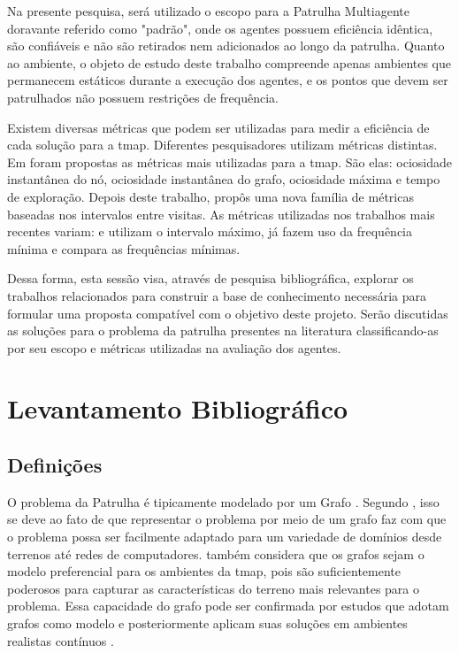 Na presente pesquisa, será utilizado o escopo para a Patrulha Multiagente 
doravante referido como "padrão", onde os agentes possuem eficiência idêntica, 
são confiáveis e não são retirados nem adicionados ao longo da patrulha. Quanto 
ao ambiente, o objeto de estudo deste trabalho compreende apenas ambientes que 
permanecem estáticos durante a execução dos agentes, e os pontos que devem ser 
patrulhados não possuem restrições de frequência.

Existem diversas métricas que podem ser utilizadas para medir a eficiência de 
cada solução para a \ac{tmap}. Diferentes pesquisadores utilizam métricas 
distintas. Em \citep{Machado:2002:MPE:1765317.1765332} foram propostas as 
métricas mais utilizadas para a \ac{tmap}. São elas: ociosidade instantânea do 
nó, ociosidade instantânea do grafo, ociosidade máxima e tempo de exploração. 
Depois deste trabalho, \citep{sampaiophd} propôs uma nova família de métricas 
baseadas nos intervalos entre visitas. As métricas utilizadas nos trabalhos mais 
recentes variam: \citep{6900280} e \citep{Pippin:2013:PBT:2480362.2480378} 
utilizam o intervalo máximo, já \citep{4209122} fazem uso da frequência mínima e 
\citep{hernandez2013game} compara as frequências mínimas.

Dessa forma, esta sessão visa, através de pesquisa bibliográfica, explorar os 
trabalhos relacionados para construir a base de conhecimento necessária para 
formular uma proposta compatível com o objetivo deste projeto. Serão discutidas 
as soluções para o problema da patrulha presentes na literatura 
classificando-as por seu escopo e métricas utilizadas na avaliação dos agentes.

\section{Levantamento Bibliográfico}

\subsection{Definições}

O problema da Patrulha é tipicamente modelado por um Grafo 
\citep{Rosen:2002:DMA:579402}. Segundo \citep{Almeida:2004:AAI}, isso se deve 
ao fato de que representar o problema por meio de um grafo faz com que o 
problema possa ser facilmente adaptado para um variedade de domínios desde 
terrenos até redes de computadores. \citep{sampaiophd} também considera que os 
grafos sejam o modelo preferencial para os ambientes da \ac{tmap}, pois são 
suficientemente poderosos para capturar as características do terreno mais 
relevantes para o problema. Essa capacidade do grafo pode ser confirmada por 
estudos que adotam grafos como modelo e posteriormente aplicam suas soluções em 
ambientes realistas contínuos \citep{Pippin:2013:PBT:2480362.2480378}.

